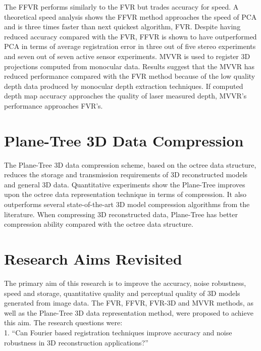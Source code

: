 The FFVR performs similarly to the FVR but trades accuracy for speed. A theoretical speed analysis shows the FFVR method approaches the speed of PCA and is three times faster than next quickest algorithm, FVR. Despite having reduced accuracy compared with the FVR, FFVR is shown to have outperformed PCA in terms of average registration error in three out of five stereo experiments and seven out of seven active sensor experiments. MVVR is used to register 3D projections computed from monocular data. Results suggest that the MVVR has reduced performance compared with the FVR method because of the low quality depth data produced by monocular depth extraction techniques. If computed depth map accuracy approaches the quality of laser measured depth, MVVR's performance approaches FVR's. \\


\section{Plane-Tree 3D Data Compression}
\label{Sec:ConcPT}

The Plane-Tree 3D data compression scheme, based on the octree data structure, reduces the storage and transmission requirements of 3D reconstructed models and general 3D data. Quantitative experiments show the Plane-Tree improves upon the octree data representation technique in terms of compression. It also outperforms several state-of-the-art 3D model compression algorithms from the literature. When compressing 3D reconstructed data, Plane-Tree has better compression ability compared with the octree data structure. \\

\section{Research Aims Revisited}

The primary aim of this research is to improve the accuracy, noise robustness, speed and storage, quantitative quality and perceptual quality of 3D models generated from image data. The FVR, FFVR, FVR-3D and MVVR methods, as well as the Plane-Tree 3D data representation method, were proposed to achieve this aim. The research questions were: \\

1. ``Can Fourier based registration techniques improve accuracy and noise robustness in 3D reconstruction applications?'' \\

